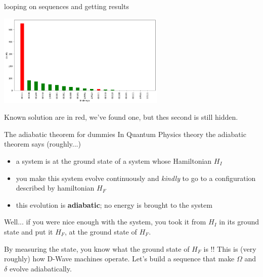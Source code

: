 \begin{frame}{looping on sequences and getting results}
 
\begin{center}
\includegraphics[width=8cm]{images/tutorials_qubo_38_0.png}    
\end{center}
Known solution are in red, we've found one, but thes second is still hidden. 
 
\end{frame}

\begin{frame}{The adiabatic theorem for dummies}
In Quantum Physics theory the adiabatic theorem says (roughly...)
\begin{itemize}
    \item a system is at the ground state of a system whose Hamiltonian $H_I$
    \item you make this system evolve continuously and \textit{kindly} to go to a configuration described by 
    hamiltonian $H_F$
    \item this evolution is \textbf{adiabatic}; no energy is brought to the system
\end{itemize}
Well... if you were nice enough with the system, you took it from $H_I$ in its ground state and put it $H_F$, at the 
ground state of $H_F$.

By measuring the state, you know what the ground state of $H_F$ is !!
This is (very roughly) how D-Wave machines operate. 
\newline
Let's build a sequence that make $\Omega$ and $\delta$ evolve adiabatically. 
\end{frame}



